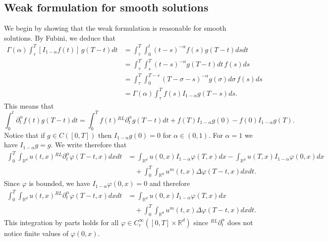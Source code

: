\documentclass[a4paper]{article}
\theoremstyle{definition}
\newcommand{\Rd}{{\mathbb{R}^d}}
\newcommand{\dRL}{{^{RL}\partial_t^\alpha}}
\begin{document}
\subsection{Weak formulation for smooth solutions}
We begin by showing that the weak formulation is reasonable for smooth solutions.
By Fubini, we deduce that
\begin{align*}
  \Gamma(\alpha) \int_\tau^T [I_{1-\alpha} f(t)] \, g(T-t) dt
  & = \int_\tau^T \int_0^t (t-s)^{-\alpha} f(s) g(T-t) ds dt
  \\
  & = \int_\tau^T \int_s^{T} (t-s)^{-\alpha} g(T-t) dt \, f(s) ds
  \\
  & = \int_\tau^T \int_0^{T-s} (T-\sigma -s)^{-\alpha} g(\sigma) d\sigma \, f(s)  ds
  \\
  & = \Gamma(\alpha) \int_\tau^T f(s) I_{1-\alpha} g (T-s) ds.
\end{align*}
This means that
\begin{equation*}
  \int_0^t \partial_t^\alpha f(t) g(T-t) dt = \int_0^T f(t) \dRL g (T-t)dt + f(T) I_{1-\alpha} g(0) - f(0) I_{1-\alpha} g(T).
\end{equation*}
Notice that if $g \in C([0,T])$ then $I_{1-\alpha} g(0) = 0$ for $\alpha \in (0,1)$.
For $\alpha = 1$ we have $I_{1-\alpha} g = g$.
We write therefore that
\begin{align*}
  \int_{0}^T \int_{\Rd}  u(t,x) \dRL  \varphi (T-t,x)dxdt
  &
  =
  \int_\Rd u(0,x) I_ {1-\alpha} \varphi(T,x) dx - \int_\Rd u(T,x) I_{1-\alpha}\varphi(0,x) dx \\
  & \quad +
  \int_0^{T} \int_{\Rd} u^{m} (t,x) \Delta \varphi (T- t,x) dxdt.
\end{align*}
Since $\varphi$ is bounded, we have $I_{1-\alpha}\varphi (0,x) = 0$ and therefore
\begin{equation*}
  \begin{aligned}
    \int_{0}^T \int_{\Rd}  u(t,x) \dRL  \varphi (T-t,x)dxdt
    &
    =
    \int_\Rd u(0,x) I_ {1-\alpha} \varphi(T,x) dx
    \\
    & \quad +\int_0^{T} \int_{\Rd} u^{m} (t,x) \Delta \varphi (T- t,x) dxdt.
  \end{aligned}
\end{equation*}
This integration by parts holds for all $\varphi \in C_c^\infty ([0,T] \times \mathbb R^d)$ since $\dRL$ does not notice finite values of $\varphi(0,x)$.

%
\end{document}
